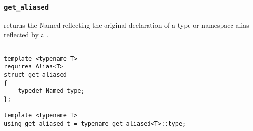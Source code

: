 
\subsubsection{\texttt{get\_aliased}}

returns the Named reflecting the original declaration of a type or namespace alias reflected by a .

\begin{verbatim}

template <typename T>
requires Alias<T>
struct get_aliased
{
	typedef Named type;
};
	
template <typename T>
using get_aliased_t = typename get_aliased<T>::type;

\end{verbatim}
